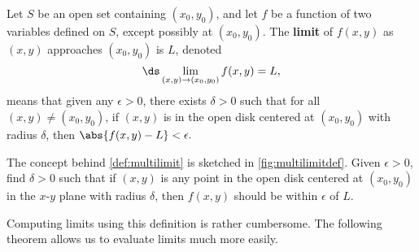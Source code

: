 \begin{definition}\label{def:multilimit}%
Let $S$ be an open set containing $(x_0,y_0)$, and let $f$ be a function of two variables defined on $S$, except possibly at $(x_0,y_0)$. 
The \textbf{limit} of $f(x,y)$ as $(x,y)$ approaches $(x_0,y_0)$ is $L$, denoted
\[\ds \lim_{(x,y)\to (x_0,y_0)} f(x,y) = L,\]
means that given any $\epsilon>0$, there exists $\delta>0$ such that for all  $(x,y)\neq (x_0,y_0)$, if $(x,y)$ is in the open disk centered at $(x_0,y_0)$ with radius $\delta$, then $\abs{f(x,y)-L}<\epsilon.$
\end{definition}


The concept behind \autoref{def:multilimit} is sketched in \autoref{fig:multilimitdef}. Given $\epsilon>0$, find $\delta>0$ such that if $(x,y)$ is any point in the open disk centered at $(x_0,y_0)$ in the $x$-$y$ plane with radius $\delta$, then $f(x,y)$ should be within $\epsilon$ of $L$. 

Computing limits using this definition is rather cumbersome. The following theorem allows us to evaluate limits much more easily.

